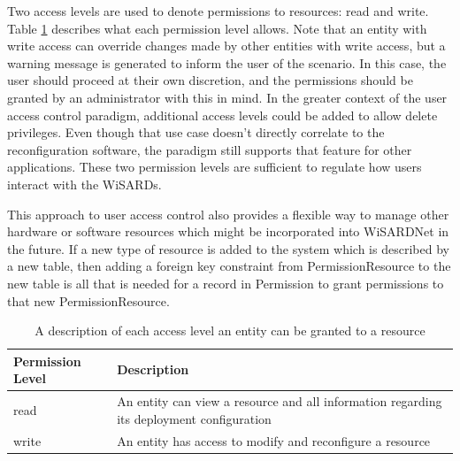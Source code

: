 Two access levels are used to denote permissions to resources: read and write. Table \ref{tab:permissions} describes what each permission level allows. Note that an entity with write access can override changes made by other entities with write access, but a warning message is generated to inform the user of the scenario. In this case, the user should proceed at their own discretion, and the permissions should be granted by an administrator with this in mind. In the greater context of the user access control paradigm, additional access levels could be added to allow delete privileges. Even though that use case doesn't directly correlate to the reconfiguration software, the paradigm still supports that feature for other applications. These two permission levels are sufficient to regulate how users  interact with the WiSARDs. 

This approach to user access control also provides a flexible way to manage other hardware or software resources which might be incorporated into WiSARDNet in the future. If a new type of resource is added to the system which is described by a new table, then adding a foreign key constraint from PermissionResource to the new table is all that is needed for a record in Permission to grant permissions to that new PermissionResource.\\


\begin{table}[H]
	\centering
	\renewcommand{\arraystretch}{1.1}
	\begin{tabular}{|p{3cm}|p{11cm}|}
	\hline
	Permission Level & Description\\
	\hline
	read & An entity can view a resource and all information regarding its deployment configuration \\
	\hline
	write & An entity has access to  modify and reconfigure a resource\\
	\hline
	\end{tabular}
	\caption{A description of each access level an entity can be granted to a resource}
	\label{tab:permissions}
\end{table}

